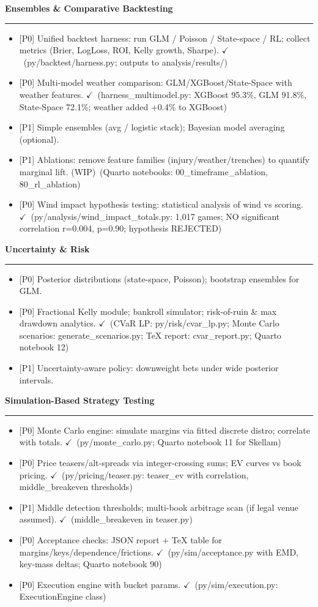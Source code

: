 \documentclass[11pt]{article}
\newcommand{\milestone}[1]{\vspace{0.5em}\noindent\textbf{\large #1}\par\vspace{0.25em}\hrule\vspace{0.5em}}
\newcommand{\done}{\textcolor{green!60!black}{\(\checkmark\)}}
\newcommand{\wip}{\textcolor{orange!80!black}{(WIP)}}
\newcommand{\prio}[1]{\textcolor{blue!70!black}{[#1]}}
\begin{document}
\milestone{Ensembles \& Comparative Backtesting}
\begin{itemize}
  \item \prio{P0} Unified backtest harness: run GLM / Poisson / State-space / RL; collect metrics (Brier, LogLoss, ROI, Kelly growth, Sharpe). \done\ (py/backtest/harness.py; outputs to analysis/results/)
  \item \prio{P0} Multi-model weather comparison: GLM/XGBoost/State-Space with weather features. \done\ (harness\_multimodel.py: XGBoost 95.3\%, GLM 91.8\%, State-Space 72.1\%; weather added +0.4\% to XGBoost)
  \item \prio{P1} Simple ensembles (avg / logistic stack); Bayesian model averaging (optional).
  \item \prio{P1} Ablations: remove feature families (injury/weather/trenches) to quantify marginal lift. \wip\ (Quarto notebooks: 00\_timeframe\_ablation, 80\_rl\_ablation)
  \item \prio{P0} Wind impact hypothesis testing: statistical analysis of wind vs scoring. \done\ (py/analysis/wind\_impact\_totals.py: 1,017 games; NO significant correlation r=0.004, p=0.90; hypothesis REJECTED)
\end{itemize}

\milestone{Uncertainty \& Risk}
\begin{itemize}
  \item \prio{P0} Posterior distributions (state-space, Poisson); bootstrap ensembles for GLM.
  \item \prio{P0} Fractional Kelly module; bankroll simulator; risk-of-ruin \& max drawdown analytics. \done\ (CVaR LP: py/risk/cvar\_lp.py; Monte Carlo scenarios: generate\_scenarios.py; TeX report: cvar\_report.py; Quarto notebook 12)
  \item \prio{P1} Uncertainty-aware policy: downweight bets under wide posterior intervals.
\end{itemize}

\milestone{Simulation-Based Strategy Testing}
\begin{itemize}
  \item \prio{P0} Monte Carlo engine: simulate margins via fitted discrete distro; correlate with totals. \done\ (py/monte\_carlo.py; Quarto notebook 11 for Skellam)
  \item \prio{P0} Price teasers/alt-spreads via integer-crossing sums; EV curves vs book pricing. \done\ (py/pricing/teaser.py: teaser\_ev with correlation, middle\_breakeven thresholds)
  \item \prio{P1} Middle detection thresholds; multi-book arbitrage scan (if legal venue assumed). \done\ (middle\_breakeven in teaser.py)
  \item \prio{P0} Acceptance checks: JSON report + TeX table for margins/keys/dependence/frictions. \done\ (py/sim/acceptance.py with EMD, key-mass deltas; Quarto notebook 90)
  \item \prio{P0} Execution engine with bucket params. \done\ (py/sim/execution.py: ExecutionEngine class)
\end{itemize}
\end{document}
